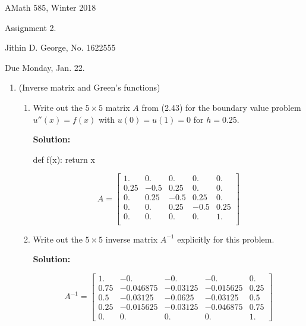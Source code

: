 \documentclass[letterpaper,12pt]{article}
\begin{document}




\noindent
{\scriptsize AMath 585, Winter 2018} \hfill 

\begin{center}
\large
Assignment 2. 
\normalsize

Jithin D. George, No. 1622555

\end{center}
\noindent
Due Monday, Jan. 22.
\vspace{.3in}




\begin{enumerate}
\item (Inverse matrix and Green's functions)
\begin{enumerate}
\item Write out the $5\times 5$
matrix $A$ from (2.43) for the boundary value problem
$u''(x)=f(x)$ with $u(0)=u(1)=0$ for  $h = 0.25$.


{\bf Solution:}
\begin{python}
def f(x):
    return x
\end{python}

\[A = \begin{bmatrix}
        1. & 0. & 0. & 0. & 0.\\
        0.25 & -0.5 & 0.25 & 0. & 0.\\ 
        0. & 0.25 & -0.5 & 0.25 & 0.\\ 
        0. & 0. & 0.25 & -0.5 & 0.25\\ 
        0. & 0. & 0. & 0. & 1.\\
        \end{bmatrix} \]


\item Write out the $5\times 5$
inverse matrix $A^{-1}$ explicitly for this problem.

{\bf Solution:}


 \[A^{-1} =\begin{bmatrix} 1. & -0. & -0. & -0. & 0.\\ 0.75 & -0.046875 & -0.03125 & -0.015625 & 0.25\\  0.5 & -0.03125 & -0.0625 & -0.03125 & 0.5\\  0.25 & -0.015625 & -0.03125 & -0.046875 & 0.75\\  0. & 0. & 0. & 0. & 1. \end{bmatrix}\]


\end{enumerate}
\end{enumerate}
\end{document}
